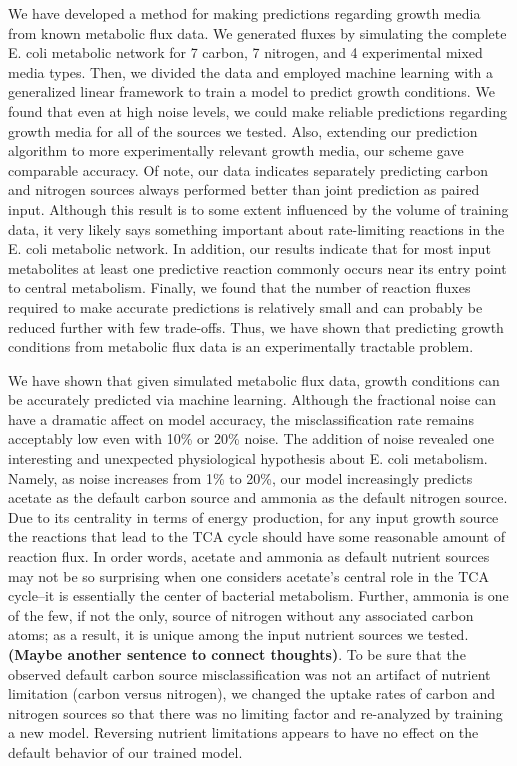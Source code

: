 \documentclass[12pt]{article}
\begin{document}
We have developed a method for making predictions regarding growth media from known metabolic flux data. We generated fluxes by simulating the complete E. coli metabolic network for 7 carbon, 7 nitrogen, and 4 experimental mixed media types. Then, we divided the data and employed machine learning with a generalized linear framework to train a model to predict growth conditions. We found that even at high noise levels, we could make reliable predictions regarding growth media for all of the sources we tested. Also, extending our prediction algorithm to more experimentally relevant growth media, our scheme gave comparable accuracy. Of note, our data indicates separately predicting carbon and nitrogen sources always performed better than joint prediction as paired input. Although this result is to some extent influenced by the volume of training data, it very likely says something important about rate-limiting reactions in the E. coli metabolic network. In addition, our results indicate that for most input metabolites at least one predictive reaction commonly occurs near its entry point to central metabolism. Finally, we found that the number of reaction fluxes required to make accurate predictions is relatively small and can probably be reduced further with few trade-offs. Thus, we have shown that predicting growth conditions from metabolic flux data is an experimentally tractable problem.

We have shown that given simulated metabolic flux data, growth conditions can be accurately predicted via machine learning. Although the fractional noise can have a dramatic affect on model accuracy, the misclassification rate remains acceptably low even with 10\% or 20\% noise. The addition of noise revealed one interesting and unexpected physiological hypothesis about E. coli metabolism. Namely, as noise increases from 1\% to 20\%, our model increasingly predicts acetate as the default carbon source and ammonia as the default nitrogen source.  Due to its centrality in terms of energy production, for any input growth source the reactions that lead to the TCA cycle should have some reasonable amount of reaction flux. In order words, acetate and ammonia as default nutrient sources may not be so surprising when one considers acetate's central role in the TCA cycle--it is essentially the center of bacterial metabolism. Further, ammonia is one of the few, if not the only, source of nitrogen without any associated carbon atoms; as a result, it is unique among the input nutrient sources we tested. \textbf{(Maybe another sentence to connect thoughts)}. To be sure that the observed default carbon source misclassification was not an artifact of nutrient limitation (carbon versus nitrogen), we changed the uptake rates of carbon and nitrogen sources so that there was no limiting factor and re-analyzed by training a new model. Reversing nutrient limitations appears to have no effect on the default behavior of our trained model.
\end{document}
